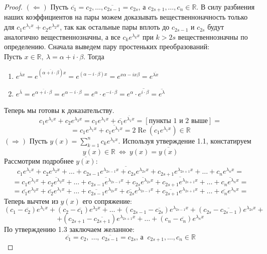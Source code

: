 \documentclass[11pt]{article}
\DeclareMathOperator{\Rere}{Re}
\begin{document}
\begin{proof}
  $(\Longleftarrow)$ Пусть $\overline{c_1} = c_2, \ldots, \overline{c_{2s - 1}} = c_{2s}$, а $c_{2s + 1}, \ldots, c_n \in \mathbb{R}$. В силу разбиения наших коэффициентов на пары можем доказывать вещественноначность только для $c_1 e^{\lambda_1 x} + c_2 e^{\lambda_2 x}$, 
  так как остальные пары вплоть до $c_{2s - 1}$ и $c_{2s}$ будут аналогично вещественнозначны, а все $c_k e^{\lambda_k x}$ при $k > 2s$ вещественнозначны по определению. Сначала выведем пару простеньких преобразований: \\
  Пусть $x \in \mathbb{R}, \ \lambda = \alpha + i \cdot \beta$. Тогда 
  \begin{enumerate}
    \item $e^{\overline{\lambda} x} = e^{(\overline{\alpha + i \cdot \beta}) x} = e^{(\alpha - i \cdot \beta) x} = e^{x \alpha - i x \beta} = e^{\overline{\lambda x}}$
    \item $e^{\overline{\lambda}} = e^{\overline{\alpha + i \cdot \beta}} = e^{\alpha - i \cdot \beta} = e^{\alpha} \cdot e^{- i \cdot \beta} = e^{\alpha} \cdot \overline{e^{i \cdot \beta}} = \overline{e^{\lambda}}$
  \end{enumerate}
  Теперь мы готовы к доказательству. 
  \[c_1 e^{\lambda_1 x} + c_2 e^{\lambda_2 x} = c_1 e^{\lambda_1 x} + \overline{c_1} e^{\overline{\lambda_1} x} = [\text{пункты 1 и 2 выше}] =\]
  \[= c_1 e^{\lambda_1 x} + \overline{c_1 e^{\lambda_1 x}} = 2 \Rere (c_1 e^{\lambda_1 x}) \in \mathbb{R}\]
  $(\Longrightarrow)$ Пусть $y(x) = \displaystyle \sum_{k = 1}^n c_k e^{\lambda_k x}$. Используя утверждение 1.1, констатируем
  \[y(x) \in \mathbb{R} \ \Longleftrightarrow \ y(x) = \overline{y(x)}\]
  Рассмотрим подробнее $\overline{y(x)}$:
  \[\overline{c_1 e^{\lambda_1 x} + c_2 e^{\lambda_2 x} + \ldots + c_{2s - 1} e^{\lambda_{2s - 1} x} + c_{2s} e^{\lambda_{2s} x} + c_{2s + 1} e^{\lambda_{2s + 1} x} + \ldots + c_n e^{\lambda_n x}} = \]
  \[= \overline{c_1 e^{\lambda_1 x}} + \overline{c_2 e^{\lambda_2 x}} + \ldots + \overline{c_{2s - 1} e^{\lambda_{2s - 1} x}} + \overline{c_{2s} e^{\lambda_{2s} x}} + \overline{c_{2s + 1} e^{\lambda_{2s + 1} x}} + \ldots + \overline{c_n e^{\lambda_n x}} =\]
  \[= \overline{c_1} e^{\lambda_2 x} + \overline{c_2} e^{\lambda_1 x} + \ldots + \overline{c_{2s - 1}} e^{\lambda_{2s} x} + \overline{c_{2s}} e^{\lambda_{2s - 1} x} + \overline{c_{2s + 1}} e^{\lambda_{2s + 1} x} + \ldots + \overline{c_n} e^{\lambda_n x} =\]
  Теперь вычтем из $y(x)$ его сопряжение:
  \[(c_1 - \overline{c_2}) e^{\lambda_1 x} + (c_2 - \overline{c_1}) e^{\lambda_2 x} + \ldots + (c_{2s - 1} - \overline{c_{2s}}) e^{\lambda_{2s - 1} x} + (c_{2s} - \overline{c_{2s - 1}}) e^{\lambda_{2s} x} +\]
  \[+ (c_{2s + 1} - \overline{c_{2s + 1}}) e^{\lambda_{2s + 1} x} + \ldots + (c_n - \overline{c_n}) e^{\lambda_n x}\]
  По утверждению 1.3 заключаем желанное:
  \[\overline{c_1} = c_2, \ \ldots, \ \overline{c_{2s - 1}} = c_{2s} \text{, а }  \ c_{2s + 1}, \ldots, c_n \in \mathbb{R}\]
\end{proof}
\end{document}

